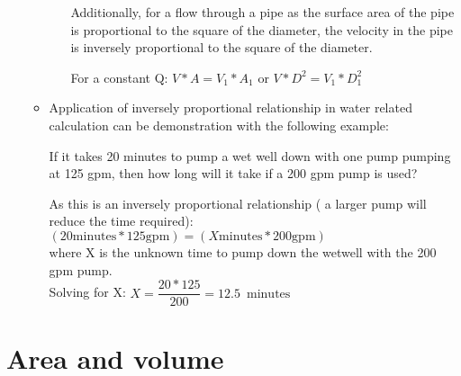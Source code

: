 \begin{itemize}
\begin{itemize}
\begin{itemize}
Additionally, for a flow through a pipe as the surface area of the pipe is proportional to the square of the diameter, the velocity in the pipe is inversely proportional to the square of the diameter.\\

\vspace{0.2cm}

For a constant Q:  $V *A = V_1 *A_1$ or $V *D^2 = V_1 *D_1^2$

\end{itemize}
\vspace{0.2cm}


\vspace{0.2cm}

\item Application of inversely proportional relationship in water related calculation can be demonstration with the following example:

If it takes 20 minutes to pump a wet well down with one pump pumping at 125 gpm, then how long will it take if a 200 gpm pump is used?

As this is an inversely proportional relationship ( a larger pump will reduce the time required):\\
\vspace{0.2cm}
$(20 \mathrm{minutes} * 125 \mathrm{gpm})=(X \mathrm{minutes} * 200 \mathrm{gpm})$ \\

where X is the unknown time to pump down the wetwell with the 200 gpm pump.\\
\vspace{0.2cm}
Solving for X: $X=\dfrac{20*125}{200}=12.5 \enspace \mathrm{minutes}$
\end{itemize}
\end{itemize}

\section{Area and volume}


